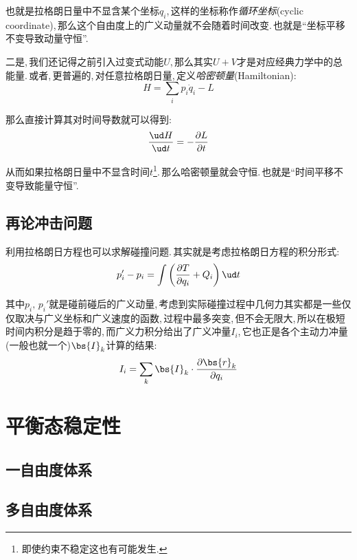 也就是拉格朗日量中不显含某个坐标$q_i$,\,这样的坐标称作\emph{循环坐标}(cyclic coordinate),\,那么这个自由度上的广义动量就不会随着时间改变.\,也就是``坐标平移不变导致动量守恒''.

二是,\,我们还记得之前引入过变式动能$U$,\,那么其实$U+V$才是对应经典力学中的总能量.\,或者,\,更普遍的,\,对任意拉格朗日量,\,定义\emph{哈密顿量}(Hamiltonian):
\[H=\sum_i p_i\dot{q}_i-L\]

那么直接计算其对时间导数就可以得到:
\[\frac{\ud H}{\ud t}=-\frac{\partial L}{\partial t}\]

从而如果拉格朗日量中不显含时间$t$\footnote{即使约束不稳定这也有可能发生.}.\,那么哈密顿量就会守恒.\,也就是``时间平移不变导致能量守恒''.


\subsection{再论冲击问题}

利用拉格朗日方程也可以求解碰撞问题.\,其实就是考虑拉格朗日方程的积分形式:
\[p_i'-p_i=\int \left(\frac{\partial T}{\partial q_i}+Q_i\right)\ud t\]

其中$p_i,\,p_i'$就是碰前碰后的广义动量,\,考虑到实际碰撞过程中几何力其实都是一些仅仅取决与广义坐标和广义速度的函数,\,过程中最多突变,\,但不会无限大,\,所以在极短时间内积分是趋于零的,\,而广义力积分给出了广义冲量$I_i$,\,它也正是各个主动力冲量(一般也就一个)$\bs{I}_k$计算的结果:
\[I_i=\sum_k \bs{I}_k\cdot \frac{\partial \bs{r}_k}{\partial q_i}\]


\section{平衡态稳定性}

\subsection{一自由度体系}



\subsection{多自由度体系}


